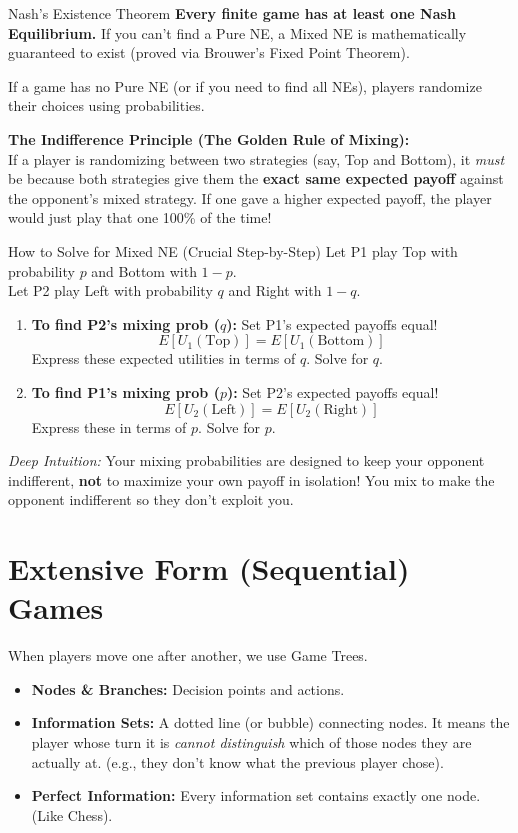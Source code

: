 \documentclass[12pt, a4paper]{article}
\begin{document}
\begin{thmbox}{Nash's Existence Theorem}
  \textbf{Every finite game has at least one Nash Equilibrium.} If you can't find a Pure NE, a Mixed NE is mathematically guaranteed to exist (proved via Brouwer's Fixed Point Theorem).
\end{thmbox}

If a game has no Pure NE (or if you need to find all NEs), players randomize their choices using probabilities.

\textbf{The Indifference Principle (The Golden Rule of Mixing):} \\
If a player is randomizing between two strategies (say, Top and Bottom), it \textit{must} be because both strategies give them the \textbf{exact same expected payoff} against the opponent's mixed strategy. If one gave a higher expected payoff, the player would just play that one 100\% of the time!

\begin{thmbox}{How to Solve for Mixed NE (Crucial Step-by-Step)}
  Let P1 play Top with probability $p$ and Bottom with $1-p$. \\
  Let P2 play Left with probability $q$ and Right with $1-q$.
  \begin{enumerate}
      \item \textbf{To find P2's mixing prob ($q$):} Set P1's expected payoffs equal!
      \[ E[U_1(\text{Top})] = E[U_1(\text{Bottom})] \]
      Express these expected utilities in terms of $q$. Solve for $q$.
      \item \textbf{To find P1's mixing prob ($p$):} Set P2's expected payoffs equal!
      \[ E[U_2(\text{Left})] = E[U_2(\text{Right})] \]
      Express these in terms of $p$. Solve for $p$.
  \end{enumerate}
\end{thmbox}
\textit{Deep Intuition:} Your mixing probabilities are designed to keep your opponent indifferent, \textbf{not} to maximize your own payoff in isolation! You mix to make the opponent indifferent so they don't exploit you.

\section{Extensive Form (Sequential) Games}

When players move one after another, we use Game Trees.
\begin{itemize}
    \item \textbf{Nodes \& Branches:} Decision points and actions.
    \item \textbf{Information Sets:} A dotted line (or bubble) connecting nodes. It means the player whose turn it is \textit{cannot distinguish} which of those nodes they are actually at. (e.g., they don't know what the previous player chose).
    \item \textbf{Perfect Information:} Every information set contains exactly one node. (Like Chess).
\end{itemize}
\end{document}
